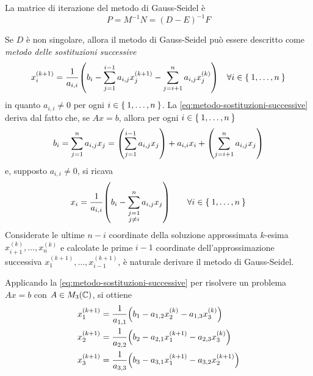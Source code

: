 	La matrice di iterazione del metodo di Gauss-Seidel è
	\begin{equation*}
		P = M^{-1} N = (D - E)^{-1} F
	\end{equation*}

	\begin{osservazione}
		Se \(D\) è non singolare, allora il metodo di Gauss-Seidel può essere descritto come \emph{metodo delle sostituzioni successive}
		\begin{equation}\label{eq:metodo-sostituzioni-successive}
			x_i^{(k + 1)} = \frac{1}{a_{i, i}} \qty(b_i - \sum_{j = 1}^{i - 1} a_{i, j} x_j^{(k + 1)} - \sum_{j = i + 1}^n a_{i, j} x_j^{(k)}) \quad \forall i \in \Set{1, \dots, n}
		\end{equation}
		in quanto \(a_{i, i} \ne 0\) per ogni \(i \in \Set{1, \dots, n}\). La \eqref{eq:metodo-sostituzioni-successive} deriva dal fatto che, se \(A x = b\), allora per ogni \(i \in \Set{1, \dots, n}\)
		\begin{equation*}
			b_i = \sum_{j = 1}^n a_{i, j} x_j = \qty(\sum_{j = 1}^{i - 1} a_{i, j} x_j) + a_{i, i} x_i + \qty(\sum_{j = i + 1}^n a_{i, j} x_j)
		\end{equation*}
		e, supposto \(a_{i, i} \ne 0\), si ricava
		\begin{equation*}
		x_i = \frac{1}{a_{i, i}} \qty(b_i - \sum_{\substack{j = 1 \\ j \ne i}}^n a_{i, j} x_j) \qquad \forall i \in \Set{1, \dots, n}
		\end{equation*}
		Considerate le ultime \(n - i\) coordinate della soluzione approssimata \(k\)-esima \(x_{i + 1}^{(k)}, \dots, x_n^{(k)}\) e calcolate le prime \(i - 1\) coordinate dell'approssimazione successiva \(x_1^{(k + 1)}, \dots, x_{i - 1}^{(k + 1)}\), è naturale derivare il metodo di Gauss-Seidel.
	\end{osservazione}

	\begin{esempio}
		Applicando la \eqref{eq:metodo-sostituzioni-successive} per risolvere un problema \(A x = b\) con \(A \in M_3 (\mathbb{C})\), si ottiene
		\begin{align*}
			x_1^{(k + 1)} &= \frac{1}{a_{1, 1}} \qty(b_1 - a_{1, 2} x_2^{(k)} - a_{1, 3} x_3^{(k)}) \\
			x_2^{(k + 1)} &= \frac{1}{a_{2, 2}} \qty(b_2 - a_{2, 1} x_1^{(k + 1)} - a_{2, 3} x_3^{(k)}) \\
			x_3^{(k + 1)} &= \frac{1}{a_{3, 3}} \qty(b_3 - a_{3, 1} x_1^{(k + 1)} - a_{3, 2} x_2^{(k + 1)})
		\end{align*}
	\end{esempio}

